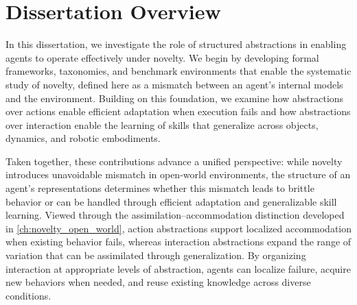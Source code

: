 \section{Dissertation Overview}
\label{sec:dissertation_overview}

In this dissertation, we investigate the role of structured abstractions in enabling agents to operate effectively under novelty. We begin by developing formal frameworks, taxonomies, and benchmark environments that enable the systematic study of novelty, defined here as a mismatch between an agent's internal models and the environment. Building on this foundation, we examine how abstractions over actions enable efficient adaptation when execution fails and how abstractions over interaction enable the learning of skills that generalize across objects, dynamics, and robotic embodiments.

Taken together, these contributions advance a unified perspective: while novelty introduces unavoidable mismatch in open-world environments, the structure of an agent's representations determines whether this mismatch leads to brittle behavior or can be handled through efficient adaptation and generalizable skill learning. Viewed through the assimilation--accommodation distinction developed in \cref{ch:novelty_open_world}, action abstractions support localized accommodation when existing behavior fails, whereas interaction abstractions expand the range of variation that can be assimilated through generalization. By organizing interaction at appropriate levels of abstraction, agents can localize failure, acquire new behaviors when needed, and reuse existing knowledge across diverse conditions.
